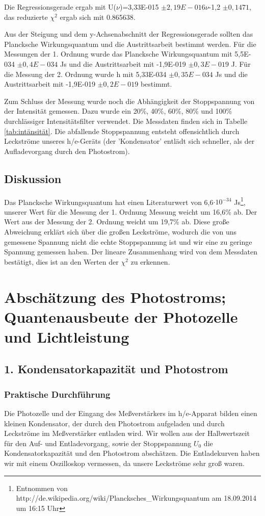 \documentclass[12px]{scrartcl}
\begin{document}
Die Regressionsgerade ergab mit U($\nu$)=3,33E-015 $\pm 2,19E-016 \nu$-1,2 $\pm 0,1471$, das reduzierte $\chi^2$ ergab sich mit 0.865638.

Aus der Steigung und dem y-Achsenabschnitt der Regressionsgerade sollten das Plancksche Wirkungsquantum und die Austrittsarbeit bestimmt werden. Für die Messungen der 1. Ordnung wurde das Plancksche Wirkungsquantum mit 5,5E-034 $\pm 0,4E-034$ Js und die Austrittsarbeit mit -1,9E-019 $\pm 0,3E-019$ J. Für die Messung der 2. Ordnung wurde h mit 5,33E-034 $\pm 0,35E-034$ Js und die Austrittsarbeit mit -1,9E-019 $\pm 0,2E-019$ bestimmt.

Zum Schluss der Messung wurde noch die Abhängigkeit der Stoppspannung von der Intensität gemessen. Dazu wurde ein 20\%, 40\%, 60\%, 80\% und 100\% durchlässiger Intensitätsfilter  verwendet. Die Messdaten finden sich in Tabelle \ref{tab:intänsität}. Die abfallende Stoppspannung entsteht offensichtlich durch Leckströme unseres h/e-Geräts (der 'Kondensator' entlädt sich schneller, als der Aufladevorgang durch den Photostrom).

\subsection{Diskussion}
Das Plancksche Wirkungsquantum hat einen Literaturwert von 6,6$\cdot 10^{-34}$ Js\footnote{Entnommen von http://de.wikipedia.org/wiki/Plancksches\_Wirkungsquantum am  18.09.2014 um 16:15 Uhr}, unserer Wert für die Messung der 1. Ordnung Messung weicht um 16,6\% ab. Der Wert aus der Messung der 2. Ordnung weicht um 19,7\% ab. Diese große  Abweichung erklärt sich über die großen Leckströme, wodurch die von uns gemessene Spannung nicht die echte Stoppspannung ist und wir eine zu geringe Spannung gemessen haben. Der lineare Zusammenhang wird von dem Messdaten bestätigt, dies ist an den Werten der $\chi^2$ zu erkennen.

\section{Abschätzung des Photostroms; Quantenausbeute der Photozelle und Lichtleistung}
\subsection{1. Kondensatorkapazität und Photostrom}
\subsubsection{Praktische Durchführung}
Die Photozelle und der Eingang des Meßverstärkers im h/e-Apparat bilden einen kleinen Kondensator, der durch den Photostrom aufgeladen und durch Leckströme im Meßverstärker entladen wird.
Wir wollen aus der Halbwertszeit für den Auf- und Entladevorgang, sowie der Stoppspannung $U_0$ die Kondensatorkapazität und den Photostrom abschätzen. Die Entladekurven haben wir mit einem Oszilloskop vermessen, da unsere Leckströme sehr groß waren.
\end{document}
